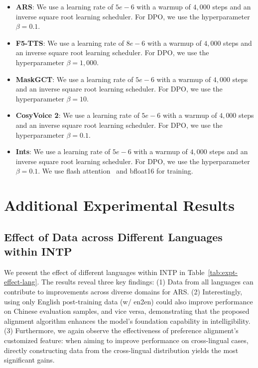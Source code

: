 \documentclass[11pt]{article}
\begin{document}
\begin{itemize}[itemsep=0ex,leftmargin=2ex]
    \item \textbf{ARS}: We use a learning rate of $5e-6$  with a warmup of $4,000$ steps and an inverse square root learning scheduler. For DPO, we use the hyperparameter $\beta = 0.1$.
    \item \textbf{F5-TTS}: We use a learning rate of $8e-6$ with a warmup of $4,000$ steps and an inverse square root learning scheduler. For DPO, we use the hyperparameter $\beta = 1,000$.
    \item \textbf{MaskGCT}: We use a learning rate of $5e-6$  with a warmup of $4,000$ steps and an inverse square root learning scheduler. For DPO, we use the hyperparameter $\beta = 10$.
    \item \textbf{CosyVoice 2}: We use a learning rate of $5e-6$  with a warmup of $4,000$ steps and an inverse square root learning scheduler. For DPO, we use the hyperparameter $\beta = 0.1$.
    \item \textbf{Ints}: We use a learning rate of $5e-6$ with a warmup of $4,000$ steps and an inverse square root learning scheduler. For DPO, we use the hyperparameter $\beta = 0.1$. We use flash attention~\cite{flashattention} and bfloat16 for training. 
\end{itemize}

\section{Additional Experimental Results}\label{sec:appendix-more-results}

\subsection{Effect of Data across Different Languages within INTP}


We present the effect of different languages within INTP in Table~\ref{tab:expt-effect-lang}. The results reveal three key findings: (1) Data from all languages can contribute to improvements across diverse domains for ARS. (2) Interestingly, using only English post-training data (w/ en2en) could also improve performance on Chinese evaluation samples, and vice versa, demonstrating that the proposed alignment algorithm enhances the model's foundation capability in intelligibility. (3) Furthermore, we again observe the effectiveness of preference alignment's customized feature: when aiming to improve performance on cross-lingual cases, directly constructing data from the cross-lingual distribution yields the most significant gains.
\end{document}
